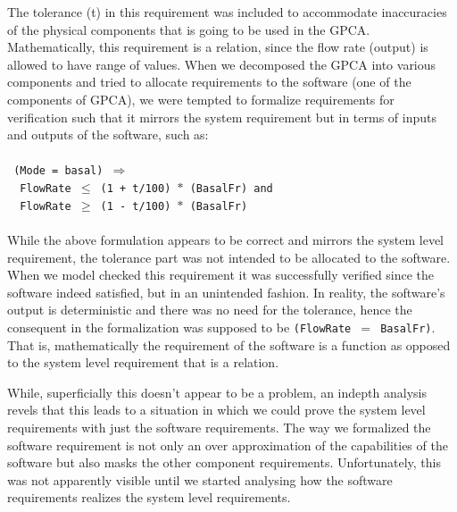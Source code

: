 The tolerance (t) in this requirement was included to accommodate inaccuracies of the physical components that is going to be used in the GPCA. Mathematically, this requirement is a relation, since the flow rate (output) is allowed to have range of values. When we decomposed the GPCA into various components and tried to allocate requirements to the software (one of the components of GPCA), we were tempted to formalize requirements for verification such that it mirrors the system requirement but in terms of inputs and outputs of the software, such as:
\\\\
\footnotesize{\texttt{
(Mode = basal) $\Rightarrow$\\
\textcolor{white}{------}FlowRate $\leq$ (1 + t/100) $\ast$ (BasalFr) and \\
\textcolor{white}{------}FlowRate $\geq$ (1 - t/100) $\ast$ (BasalFr)\\
}}
\normalsize{}\\
While the above formulation appears to be correct and mirrors the system level requirement, the tolerance part was not intended to be allocated to the software. When we model checked this requirement it was successfully verified since the software indeed satisfied, but in an unintended fashion. In reality, the software's output is deterministic and there was no need for the tolerance, hence the consequent in the formalization was supposed to be \texttt{(FlowRate $=$ BasalFr)}. That is, mathematically the requirement of the software is a function as opposed to the system level requirement that is a relation. %

While, superficially this doesn't appear to be a problem, an indepth analysis revels that this leads to a situation in which we could prove the system level requirements with just the software requirements. The way we formalized the software requirement is not only an over approximation of the capabilities of the software but also masks the other component requirements. Unfortunately, this was not apparently visible until we started analysing how the software requirements realizes the system level requirements.
